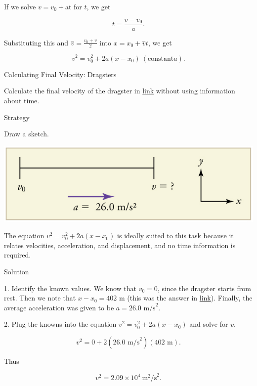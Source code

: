 \documentclass[
]{book}
\begin{document}
If we solve \({v = {v_{0} + \text{at}}}{}\) for \(t{}\), we get

\leavevmode{}%
\[{{t = \frac{v - v_{0}}{a}}\text{.}}{}\]

Substituting this and \({\overset{-}{v} = \frac{v_{0} + v}{2}}{}\) into
\({{x = {x_{0} + \overset{-}{v}}}t}{}\), we get

\leavevmode{}%
\[{v^{2} = {v_{0}^{2} + 2a}}\left( {x - x_{0}} \right)\ (\text{constant} a)\text{.}\]

\hypertarget{fs-id1164906443776}{}
Calculating Final Velocity: Dragsters

Calculate the final velocity of the dragster in
\protect\hyperlink{fs-id1164906457202}{link} without using
information about time.

{Strategy}

Draw a sketch.

\includegraphics{images/Figure_02_04_02b.jpg}

The equation \({{v^{2} = {v_{0}^{2} + 2a}}({x - x_{0}})}{}\) is ideally
suited to this task because it relates velocities, acceleration, and
displacement, and no time information is required.

{Solution}

1. Identify the known values. We know that \({v_{0} = 0}{}\), since the
dragster starts from rest. Then we note that
\({{x - x_{0}} = \text{402\ m}}{}\) (this was the answer in
\protect\hyperlink{fs-id1164906457202}{link}). Finally, the
average acceleration was given to be
\({{a = \text{26}}\text{.}\text{0\ m/s}^{2}}{}\).

2. Plug the knowns into the equation
\({v^{2} = {v_{0}^{2} + 2a}}({x - x_{0}})\) and solve for \(v.\)

\leavevmode{}%
\[{{{v^{2} = {0 + 2}}\left( {\text{26}\text{.}\text{0\ m/s}^{2}} \right)\left( \text{402\ m} \right)}.}{}\]

Thus

\leavevmode{}%
\[{{{v^{2} = 2}\text{.}{\text{09} \times \text{10}^{4}}\ \text{m}^{2}\text{/s}^{2}}.}{}\]
\end{document}

